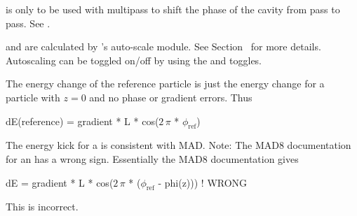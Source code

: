  is only to be used with multipass to shift the phase of the cavity from pass to
pass. See .

 and  are calculated by \bmad's auto-scale module. See
Section~ for more details. Autoscaling can be toggled on/off by using the
 and  toggles.

The energy change of the reference particle is just the energy change for a 
particle with $z = 0$ and no phase or gradient errors. Thus
\begin{example}
  dE(reference) = gradient * L * cos(\(2\,\pi\) * \(\phi_{\text{ref}}\))
\end{example}

The energy kick for a \bmad {} is consistent with MAD. 
Note: The MAD8 documentation for an  has a wrong
sign. Essentially the MAD8 documentation gives
\begin{example}
  dE = gradient * L * cos(\(2\,\pi\) * (\(\phi_{\text{ref}}\) - phi(z))) ! WRONG
\end{example}
This is incorrect. 

